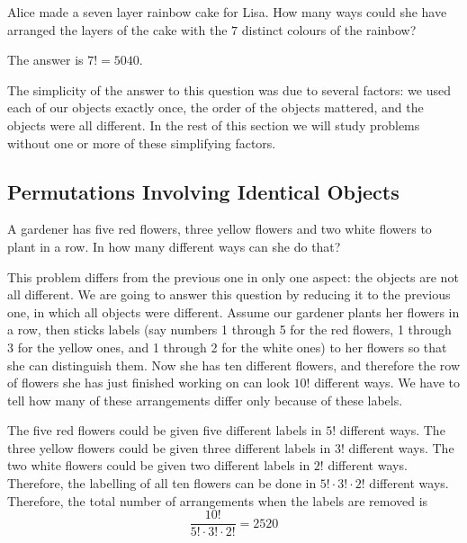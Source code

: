\documentclass[11pt,a4paper]{book}
\begin{document}
\begin{example}

Alice made a seven layer rainbow cake for Lisa. How many ways could
she have arranged the layers of the cake with the $7$ distinct colours
of the rainbow?

\Solution

The answer is $7!=5040$.

\end{example}

The simplicity of the answer to this question was due to several
factors: we used each of our objects exactly once, the order of the
objects mattered, and the objects were all different. In the rest
of this section we will study problems without one or more of these
simplifying factors.

\subsection{Permutations Involving Identical Objects}

\begin{example}

A gardener has five red flowers, three yellow flowers and two white
flowers to plant in a row. In how many different ways can she do that?

\Solution

This problem differs from the previous one in only one aspect: the
objects are not all different. We are going to answer this question
by reducing it to the previous one, in which all objects were different.
Assume our gardener plants her flowers in a row, then sticks labels
(say numbers 1 through 5 for the red flowers, 1 through 3 for the
yellow ones, and 1 through 2 for the white ones) to her flowers so
that she can distinguish them. Now she has ten different flowers,
and therefore the row of flowers she has just finished working on
can look $10!$ different ways. We have to tell how many of these
arrangements differ only because of these labels.

The five red flowers could be given five different labels in $5!$
different ways. The three yellow flowers could be given three different
labels in $3!$ different ways. The two white flowers could be given
two different labels in $2!$ different ways. Therefore, the labelling
of all ten flowers can be done in $5!\cdot3!\cdot2!$ different ways.
Therefore, the total number of arrangements when the labels are removed
is
\[
\frac{10!}{5!\cdot3!\cdot2!}=2520
\]

\end{example}
\end{document}
